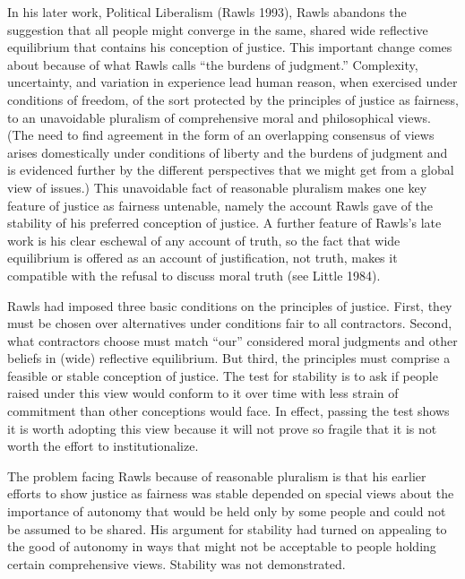\documentclass[]{article}
\begin{document}
In his later work, Political Liberalism (Rawls 1993), Rawls abandons the
suggestion that all people might converge in the same, shared wide
reflective equilibrium that contains his conception of justice. This
important change comes about because of what Rawls calls ``the burdens
of judgment.'' Complexity, uncertainty, and variation in experience lead
human reason, when exercised under conditions of freedom, of the sort
protected by the principles of justice as fairness, to an unavoidable
pluralism of comprehensive moral and philosophical views. (The need to
find agreement in the form of an overlapping consensus of views arises
domestically under conditions of liberty and the burdens of judgment and
is evidenced further by the different perspectives that we might get
from a global view of issues.) This unavoidable fact of reasonable
pluralism makes one key feature of justice as fairness untenable, namely
the account Rawls gave of the stability of his preferred conception of
justice. A further feature of Rawls's late work is his clear eschewal of
any account of truth, so the fact that wide equilibrium is offered as an
account of justification, not truth, makes it compatible with the
refusal to discuss moral truth (see Little 1984).

Rawls had imposed three basic conditions on the principles of justice.
First, they must be chosen over alternatives under conditions fair to
all contractors. Second, what contractors choose must match ``our''
considered moral judgments and other beliefs in (wide) reflective
equilibrium. But third, the principles must comprise a feasible or
stable conception of justice. The test for stability is to ask if people
raised under this view would conform to it over time with less strain of
commitment than other conceptions would face. In effect, passing the
test shows it is worth adopting this view because it will not prove so
fragile that it is not worth the effort to institutionalize.

The problem facing Rawls because of reasonable pluralism is that his
earlier efforts to show justice as fairness was stable depended on
special views about the importance of autonomy that would be held only
by some people and could not be assumed to be shared. His argument for
stability had turned on appealing to the good of autonomy in ways that
might not be acceptable to people holding certain comprehensive views.
Stability was not demonstrated.
\end{document}
